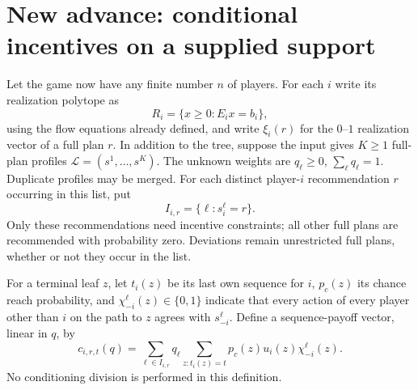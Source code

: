 \documentclass[11pt]{article}
\theoremstyle{definition}
\begin{document}
\section{New advance: conditional incentives on a supplied support}
Let the game now have any finite number $n$ of players. For each $i$ write
its realization polytope as
\[
 R_i=\{x\geq0:E_i x=b_i\},
\]
using the flow equations already defined, and write $\xi_i(r)$ for the
$0$--$1$ realization vector of a full plan $r$. In addition to the tree,
suppose the input gives $K\geq1$ full-plan profiles
$\mathcal L=(s^1,\ldots,s^K)$. The unknown weights are
$q_\ell\geq0$, $\sum_\ell q_\ell=1$. Duplicate profiles may be merged.
For each distinct player-$i$ recommendation $r$ occurring in this list, put
\[
 I_{i,r}=\{\ell:s_i^\ell=r\}.
\]
Only these recommendations need incentive constraints; all other full plans
are recommended with probability zero. Deviations remain unrestricted full
plans, whether or not they occur in the list.

For a terminal leaf $z$, let $t_i(z)$ be its last own sequence for $i$,
$p_c(z)$ its chance reach probability, and
$\chi_{-i}^{\ell}(z)\in\{0,1\}$ indicate that every action of every player
other than $i$ on the path to $z$ agrees with $s_{-i}^{\ell}$.
Define a sequence-payoff vector, linear in $q$, by
\[
 c_{i,r,t}(q)=\sum_{\ell\in I_{i,r}}q_\ell
       \sum_{z:t_i(z)=t}p_c(z)u_i(z)\chi_{-i}^{\ell}(z).
 \tag{1}
\]
No conditioning division is performed in this definition.
\end{document}
